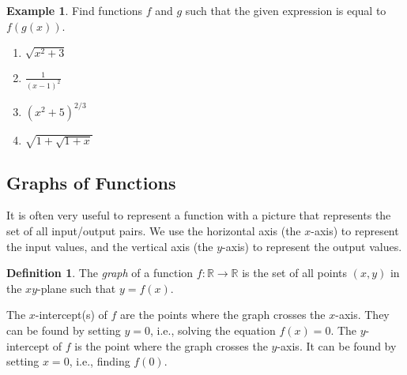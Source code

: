 \documentclass[letterpaper,12pt,oneside]{book}
\theoremstyle{definition}
\newtheorem{definition}[theorem]{Definition}
\newtheorem{example}[theorem]{Example}
\newcommand{\dsp}{\displaystyle}
\begin{document}
{\begin{example}
Find functions $f$ and $g$ such that the given expression is equal to $f(g(x))$.
\begin{enumerate}
\item $\sqrt{x^2+3}$
\vfill
\item $\dsp\frac{1}{(x-1)^2}$
\vfill
\item $(x^2+5)^{2/3}$
\vfill
\item $\dsp\sqrt{1+\sqrt{1+x}}$
\end{enumerate}
\end{example}

\newpage

\subsection*{Graphs of Functions}

\noindent
It is often very useful to represent a function with a picture that represents the set of all input/output pairs.  We use the horizontal axis (the $x$-axis) to represent the input values, and the vertical axis (the $y$-axis) to represent the output values.

\begin{definition}
The \emph{graph} of a function $f:\mathbb{R}\rightarrow\mathbb{R}$ is the set of all points $(x,y)$ in the $xy$-plane such that $y=f(x)$.
\end{definition}

The $x$-intercept(s) of $f$ are the points where the graph crosses the $x$-axis.  They can be found by setting $y=0$, i.e., solving the equation $f(x)=0$.  The $y$-intercept of $f$ is the point where the graph crosses the $y$-axis.  It can be found by setting $x=0$, i.e., finding $f(0)$.

}
\end{document}
